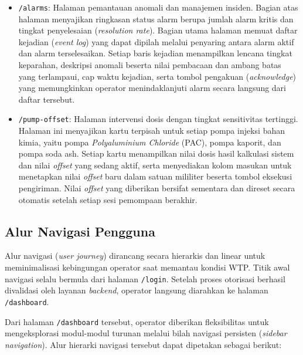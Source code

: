 \begin{itemize}
    \item \texttt{/alarms}: Halaman pemantauan anomali dan manajemen insiden. Bagian atas halaman menyajikan ringkasan 
    status alarm berupa jumlah alarm kritis dan tingkat penyelesaian (\textit{resolution rate}). Bagian utama halaman 
    memuat daftar kejadian (\textit{event log}) yang dapat dipilah melalui penyaring antara alarm aktif dan alarm 
    terselesaikan. Setiap baris kejadian menampilkan lencana tingkat keparahan, deskripsi anomali beserta nilai 
    pembacaan dan ambang batas yang terlampaui, cap waktu kejadian, serta tombol pengakuan (\textit{acknowledge}) 
    yang memungkinkan operator menindaklanjuti alarm secara langsung dari daftar tersebut.
    
    \item \texttt{/pump-offset}: Halaman intervensi dosis dengan tingkat sensitivitas tertinggi. Halaman ini menyajikan 
    kartu terpisah untuk setiap pompa injeksi bahan kimia, yaitu pompa \textit{Polyaluminium Chloride} (PAC), pompa 
    kaporit, dan pompa soda ash. Setiap kartu menampilkan nilai dosis hasil kalkulasi sistem dan nilai \textit{offset} 
    yang sedang aktif, serta menyediakan kolom masukan untuk menetapkan nilai \textit{offset} baru dalam satuan mililiter 
    beserta tombol eksekusi pengiriman. Nilai \textit{offset} yang diberikan bersifat sementara dan direset secara 
    otomatis setelah setiap sesi pemompaan berakhir.
\end{itemize}

\subsection{Alur Navigasi Pengguna}
Alur navigasi (\textit{user journey}) dirancang secara hierarkis dan linear untuk meminimalisasi kebingungan operator saat 
memantau kondisi WTP. Titik awal navigasi selalu bermula dari halaman \texttt{/login}. Setelah proses otorisasi berhasil 
divalidasi oleh layanan \textit{backend}, operator langsung diarahkan ke halaman \texttt{/dashboard}.

Dari halaman \texttt{/dashboard} tersebut, operator diberikan fleksibilitas untuk mengeksplorasi modul-modul turunan melalui 
bilah navigasi persisten (\textit{sidebar navigation}). Alur hierarki navigasi tersebut dapat dipetakan sebagai berikut:

